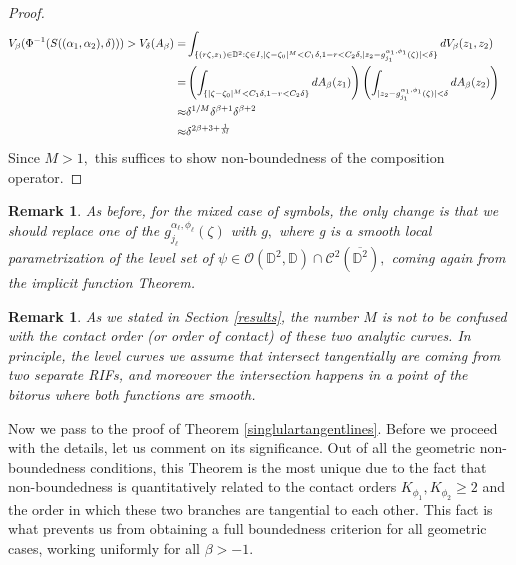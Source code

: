 \documentclass[12pt]{amsart}
\newtheorem{remark}[theorem]{Remark}
\numberwithin{equation}{section}
\begin{document}
\begin{proof}
\begin{align}
V_{\beta}(\Phi^{-1}(S((\alpha_1,\alpha_2),\delta)))>V_{\delta}(A_{\beta})=&\int_{\{(r\zeta,z_1)\in\mathbb{D}^2:\zeta\in I,|\zeta-\zeta_0|^M<C_1\delta,1-r<C_2\delta, |z_2-g^{\alpha_1,\phi_1}_{j_1}(\zeta)|<\delta\}}dV_{\beta}(z_1,z_2)\notag&&\\
=&\left(\int_{\{|\zeta-\zeta_0|^M<C_1\delta,1-r<C_2\delta\}}dA_{\beta}(z_1)\right)\left(\int_{|z_2-g^{\alpha_1,\phi_1}_{j_1}(\zeta)|<\delta}dA_{\beta}(z_2)\right)\notag&&\\
\approx &\delta^{1/M}\delta^{\beta+1}\delta^{\beta+2}&&\\
\approx &\delta^{2\beta+3+\frac{1}{M}} \notag
\end{align}
Since $M>1,$ this suffices to show non-boundedness of the composition operator.
\end{proof}
\begin{remark} As before, for the mixed case of symbols, the only change is that we should replace one of the $g^{\alpha_\ell,\phi_\ell}_{j_{\ell}}(\zeta)$ with $g,$ where g is a smooth local parametrization of the level set of $\psi\in\mathcal{O}(\mathbb{D}^2,\mathbb{D})\cap \mathcal{C}^2(\overline{\mathbb{D}^2}),$ coming again from the \textit{implicit function Theorem}.
\end{remark}
\begin{remark} As we stated in Section \ref{results}, the number $M$ is not to be confused with the contact order (or order of contact) of these two analytic curves. In principle, the level curves we assume that intersect tangentially are coming from two separate RIFs, and moreover the intersection happens in a point of the bitorus where both functions are smooth.
\end{remark}
Now we pass to the proof of Theorem \ref{singlulartangentlines}. Before we proceed with the details, let us comment on its significance. Out of all the geometric non-boundedness conditions, this Theorem is the most unique due to the fact that non-boundedness is quantitatively related to the contact orders $K_{{\phi_1}},K_{\phi_{2}}\ge2$ and the order in which these two branches are tangential to each other.
This fact is what prevents us from obtaining a full boundedness criterion for all geometric cases, working uniformly for all $\beta>-1.$ 
\end{document}
